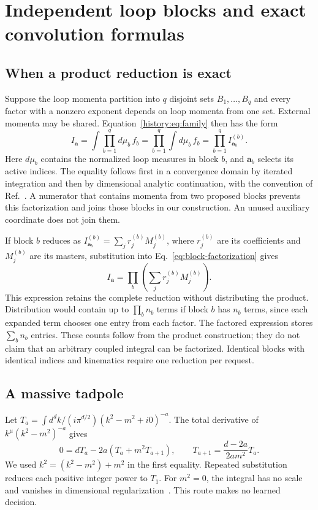 \section{Independent loop blocks and exact convolution formulas}
\label{app:blocks13}
\subsection{When a product reduction is exact}
Suppose the loop momenta partition into $q$ disjoint sets $B_1,\ldots,B_q$ and every factor with a nonzero exponent depends on loop momenta from one set. External momenta may be shared. Equation~\eqref{history:eq:family} then has the form
\begin{equation}
 I_{\boldsymbol a}=\int\prod_{b=1}^{q}d\mu_b\,f_b
 =\prod_{b=1}^{q}\int d\mu_b\,f_b
 =\prod_{b=1}^{q}I^{(b)}_{\boldsymbol a_b}.
 \label{eq:block-factorization}
\end{equation}
Here $d\mu_b$ contains the normalized loop measures in block $b$, and $\boldsymbol a_b$ selects its active indices. The equality follows first in a convergence domain by iterated integration and then by dimensional analytic continuation, with the convention of Ref.~\cite{Weinzierl2022}. A numerator that contains momenta from two proposed blocks prevents this factorization and joins those blocks in our construction. An unused auxiliary coordinate does not join them.

If block $b$ reduces as $I^{(b)}_{\boldsymbol a_b}=\sum_jr^{(b)}_jM^{(b)}_j$, where $r^{(b)}_j$ are its coefficients and $M^{(b)}_j$ are its masters, substitution into Eq.~\eqref{eq:block-factorization} gives
\begin{equation}
 I_{\boldsymbol a}=\prod_b\left(\sum_jr^{(b)}_jM^{(b)}_j\right).
 \label{eq:factored-expansion}
\end{equation}
This expression retains the complete reduction without distributing the product. Distribution would contain up to $\prod_b n_b$ terms if block $b$ has $n_b$ terms, since each expanded term chooses one entry from each factor. The factored expression stores $\sum_b n_b$ entries. These counts follow from the product construction; they do not claim that an arbitrary coupled integral can be factorized. Identical blocks with identical indices and kinematics require one reduction per request.

\subsection{A massive tadpole}
Let $T_a=\int d^dk/(i\pi^{d/2})(k^2-m^2+i0)^{-a}$. The total derivative of $k^\mu(k^2-m^2)^{-a}$ gives
\begin{equation}
 0=dT_a-2a(T_a+m^2T_{a+1}),\qquad
 T_{a+1}=\frac{d-2a}{2am^2}T_a.
 \label{eq:tadpole13}
\end{equation}
We used $k^2=(k^2-m^2)+m^2$ in the first equality. Repeated substitution reduces each positive integer power to $T_1$. For $m^2=0$, the integral has no scale and vanishes in dimensional regularization~\cite{Weinzierl2022}. This route makes no learned decision.

